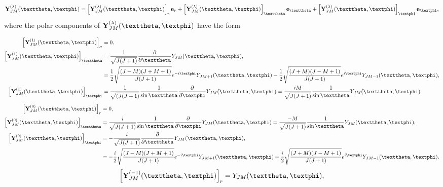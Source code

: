 \begin{enumerate}[label=(\alph*)]
\begin{equation}
\vect{Y}_{J M}^{(\lambda)}(\vartheta, \varphi)=\left[\vect{Y}_{J M}^{(\lambda)}(\vartheta, \varphi)\right]_{r} \vect{e}_{r}+\left[\vect{Y}_{J M}^{(\lambda)}(\vartheta, \varphi)\right]_{\vartheta} \vect{e}_{\vartheta}+\left[\vect{Y}_{J M}^{(\lambda)}(\vartheta, \varphi)\right]_{\varphi} \vect{e}_{\varphi}, \label{eq:7:3:24}
\end{equation}
where the polar components of $\vect{Y}_{J M}^{(\lambda)}(\vartheta, \varphi)$ have the form
\begin{fleqn}
\begin{align}
{\left[\vect{Y}_{J M}^{(1)}(\vartheta, \varphi)\right]_{\sigma} } & =0, \notag\\
{\left[\vect{Y}_{J M}^{(1)}(\vartheta, \varphi)\right]_{\vartheta} } & =\frac{1}{\sqrt{J(J+1)}}   \frac{\partial}{\partial \vartheta} Y_{J M}(\vartheta, \varphi), \notag\\
& =\frac{1}{2} \sqrt{\frac{(J-M)(J+M+1)}{J(J+1)}} e^{-i \varphi} Y_{J M+1}(\vartheta, \varphi)-\frac{1}{2} \sqrt{\frac{(J+M)(J-M+1)}{J(J+1)}} e^{i \varphi} Y_{J M-1}(\vartheta, \varphi), \notag\\
{\left[\vect{Y}_{J M}^{(1)}(\vartheta, \varphi)\right]_{\varphi} } & =\frac{1}{\sqrt{(J(J+1)}}   \frac{1}{\sin \vartheta}   \frac{\partial}{\partial \varphi} Y_{J M}(\vartheta, \varphi)=\frac{i M}{\sqrt{J(J+1)}}   \frac{1}{\sin \vartheta} Y_{J M}(\vartheta, \varphi). \label{eq:7:3:25}
\end{align}
\begin{align}
{\left[\vect{Y}_{J M}^{(0)}(\vartheta, \varphi)\right]_{r} } & =0, \notag\\
{\left[\vect{Y}_{J M}^{(0)}(\vartheta, \varphi)\right]_{\vartheta} } & =\frac{i}{\sqrt{J(J+1)}}   \frac{1}{\sin \vartheta}   \frac{\partial}{\partial \varphi} Y_{J M}(\vartheta, \varphi)=\frac{-M}{\sqrt{J(J+1)}}   \frac{1}{\sin \vartheta} Y_{J M}(\vartheta, \varphi), \notag\\
{\left[\vect{Y}_{J M}^{(0)}(\vartheta, \varphi)\right]_{\varphi} } & =-\frac{i}{\sqrt{J(J+1)}}   \frac{\partial}{\partial \vartheta} Y_{J M}(\vartheta, \varphi), \notag\\
& =-\frac{i}{2} \sqrt{\frac{(J-M)(J+M+1)}{J(J+1)}} e^{-i \varphi} Y_{J M+1}(\vartheta, \varphi)+\frac{i}{2} \sqrt{\frac{(J+M)(J-M+1)}{J(J+1)}} e^{i \varphi} Y_{J M-1}(\vartheta, \varphi). \label{eq:7:3:26}
\end{align}
\begin{align}
& {\left[\vect{Y}_{J M}^{(-1)}(\vartheta, \varphi)\right]_{r}=Y_{J M}(\vartheta, \varphi)}, \notag\\

\end{align}
\end{fleqn}
\end{enumerate}
